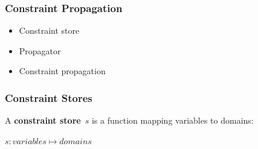\documentclass{beamer}
\newcommand{\Dom}[1]{\text{dom}({#1})}
\begin{document}



\begin{frame}
  \frametitle{Constraint Propagation}
  \begin{itemize}
    \item Constraint store
    \item Propagator
    \item Constraint propagation
  \end{itemize}
\end{frame}

\begin{frame}
  \frametitle{Constraint Stores}
  \begin{definition}
    A \textbf{constraint store}~$s$ is a function mapping variables
    to domains:
    \begin{center}
      $s: variables \mapsto domains$
    \end{center}
  \end{definition}

  



\end{frame}
\end{document}
